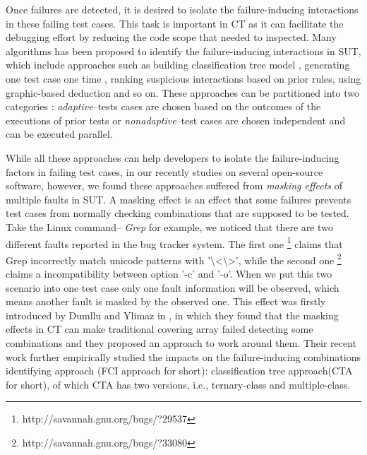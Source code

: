 \documentclass{sig-alternate}
\begin{document}
Once failures are detected, it is desired to isolate the failure-inducing interactions in these failing test cases. This task is important in CT as it can facilitate the debugging effort by reducing the code scope that needed to inspected. Many algorithms has been proposed to identify the failure-inducing interactions in SUT, which include approaches such as building classification tree model \cite{yilmaz2006covering}, generating one test case one time \cite{nie2011minimal}, ranking suspicious interactions based on prior rules\cite{ghandehari2012identifying}, using graphic-based deduction \cite{martinez2008algorithms} and so on. These approaches can be partitioned into two categories \cite{colbourn2008locating}: \emph{adaptive}--tests cases are chosen based on the outcomes of the executions of prior tests or \emph{nonadaptive}--test cases are chosen independent and can be executed parallel.

While all these approaches can help developers to isolate the failure-inducing factors in failing test cases, in our recently studies on several open-source software, however, we found these approaches suffered from \emph{masking effects} of multiple faults in SUT. A masking effect \cite{dumlu2011feedback,yilmaz2013reducing} is an effect that some failures prevents test cases from normally checking combinations that are supposed to be tested. Take the Linux command-- \emph{Grep} for example, we noticed that there are two different faults reported in the bug tracker system. The first one \footnote{http://savannah.gnu.org/bugs/?29537}  claims that Grep incorrectly match unicode patterns with '\textbackslash<\textbackslash>', while the second one \footnote{http://savannah.gnu.org/bugs/?33080} claims a incompatibility between option '-c' and '-o'. When we put this two scenario into one test case only one fault information will be observed, which means another fault is masked by the observed one. This effect was firstly introduced by Dumllu and Ylimaz in \cite{dumlu2011feedback}, in which they found that the masking effects in CT can make traditional covering array failed detecting some combinations and they proposed an approach to work around them. Their recent work \cite{yilmaz2013reducing} further empirically studied the impacts on the failure-inducing combinations identifying approach (FCI approach for short):  classification tree approach(CTA for short)\cite{yilmaz2006covering}, of which CTA has two versions, i.e., ternary-class and multiple-class. 

\end{document}
